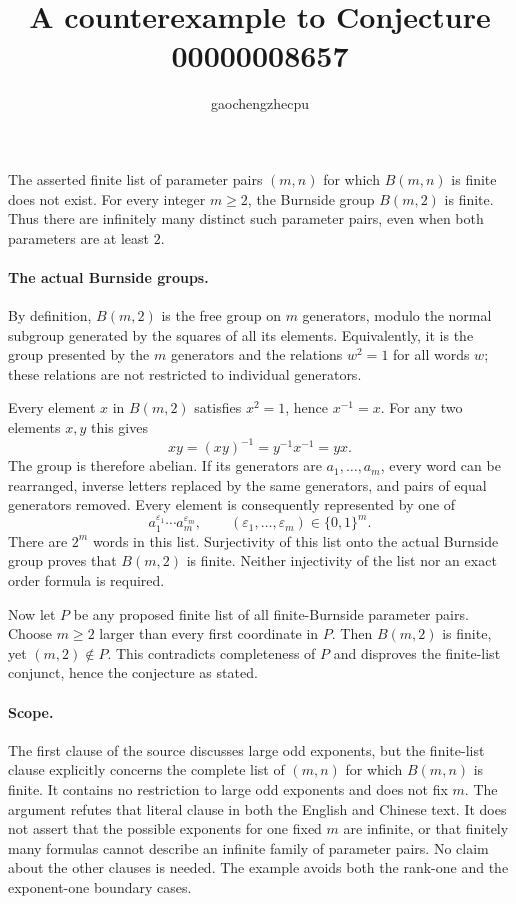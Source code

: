 \documentclass[11pt]{article}
\title{A counterexample to Conjecture 00000008657}
\author{gaochengzhecpu}
\date{}
\begin{document}
\maketitle

The asserted finite list of parameter pairs $(m,n)$ for which $B(m,n)$ is
finite does not exist.  For every integer $m\ge2$, the Burnside group
$B(m,2)$ is finite.  Thus there are infinitely many distinct such parameter
pairs, even when both parameters are at least $2$.

\paragraph{The actual Burnside groups.}
By definition, $B(m,2)$ is the free group on $m$ generators, modulo the
normal subgroup generated by the squares of all its elements.  Equivalently,
it is the group presented by the $m$ generators and the relations
$w^2=1$ for all words $w$; these relations are not restricted to individual
generators.

Every element $x$ in $B(m,2)$ satisfies $x^2=1$, hence $x^{-1}=x$.
For any two elements $x,y$ this gives
\[
 xy=(xy)^{-1}=y^{-1}x^{-1}=yx.
\]
The group is therefore abelian.  If its generators are $a_1,\ldots,a_m$,
every word can be rearranged, inverse letters replaced by the same generators,
and pairs of equal generators removed.  Every element is consequently
represented by one of
\[
 a_1^{\varepsilon_1}\cdots a_m^{\varepsilon_m},
 \qquad (\varepsilon_1,\ldots,\varepsilon_m)\in\{0,1\}^m.
\]
There are $2^m$ words in this list.  Surjectivity of this list onto the actual
Burnside group proves that $B(m,2)$ is finite.  Neither injectivity of the list
nor an exact order formula is required.

Now let $P$ be any proposed finite list of all finite-Burnside parameter
pairs.  Choose $m\ge2$ larger than every first coordinate in $P$.
Then $B(m,2)$ is finite, yet $(m,2)\notin P$.  This contradicts completeness
of $P$ and disproves the finite-list conjunct, hence the conjecture as stated.

\paragraph{Scope.}
The first clause of the source discusses large odd exponents, but the
finite-list clause explicitly concerns the complete list of $(m,n)$ for
which $B(m,n)$ is finite.  It contains no restriction to large odd exponents
and does not fix $m$.  The argument refutes that literal clause in both the
English and Chinese text.  It does not assert that the possible exponents
for one fixed $m$ are infinite, or that finitely many formulas cannot describe
an infinite family of parameter pairs.  No claim about the other clauses is
needed.  The example avoids both the rank-one and the exponent-one boundary
cases.
\end{document}
